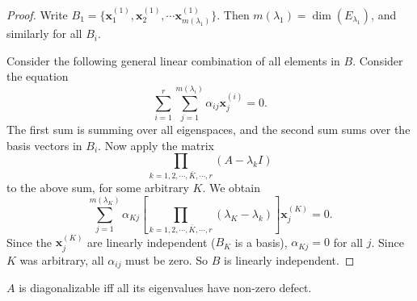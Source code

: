 \documentclass[a4paper]{article}
\begin{document}
      \begin{proof}
        Write $B_1 = \{\mathbf{x}_1^{(1)}, \mathbf{x}_2^{(1)}, \cdots \mathbf{x}_{m(\lambda_1)}^{(1)}\}$. Then $m(\lambda_1) = \dim (E_{\lambda_1})$, and similarly for all $B_i$.

        Consider the following general linear combination of all elements in $B$. Consider the equation
        \[
          \sum_{i = 1}^r\sum_{j = 1}^{m(\lambda_i)} \alpha_{ij} \mathbf{x}_j^{(i)} = 0.
        \]
        The first sum is summing over all eigenspaces, and the second sum sums over the basis vectors in $B_i$. Now apply the matrix
        \[
          \prod_{k = 1, 2, \cdots, \bar{K}, \cdots, r} (A - \lambda_kI)
        \]
        to the above sum, for some arbitrary $K$. We obtain
        \[
          \sum_{j = 1}^{m(\lambda_K)}\alpha_{Kj}\left[\prod_{k = 1, 2, \cdots, \bar{K}, \cdots, r}(\lambda_K - \lambda_k)\right]\mathbf{x}_j^{(K)} = 0.
        \]
        Since the $\mathbf{x}^{(K)}_j$ are linearly independent ($B_K$ is a basis), $\alpha_{Kj} = 0$ for all $j$. Since $K$ was arbitrary, all $\alpha_{ij}$ must be zero. So $B$ is linearly independent.
      \end{proof}

      \begin{prop}
        $A$ is diagonalizable iff all its eigenvalues have non-zero defect.
      \end{prop}
\end{document}
